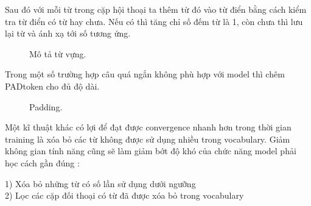 Sau đó với mỗi từ trong cặp hội thoại ta thêm từ đó vào từ điển bằng cách kiểm tra từ điển có từ hay chưa. Nếu có thì
tăng chỉ số đếm từ là 1, còn chưa thì lưu lại từ và ánh xạ tới số tương ứng. \\
\begin{figure}[!htb]
    \caption{\label{fig:no_padding} Mô tả từ vựng.}
\end{figure}
Trong một số trường hợp câu quá ngắn không phù hợp với model thì chêm PAD\detokenize{_}token cho đủ độ dài. \\
\begin{figure}[!htb]
    \caption{\label{fig:no_padding} Padding.}
\end{figure}
Một kĩ thuật khác có lợi để đạt được convergence nhanh hơn trong thời gian training là xóa bỏ các từ không được sử dụng nhiều trong vocabulary. Giảm không gian tính năng cũng sẽ làm giảm bớt độ khó của chức năng model phải học cách gần đúng :

1) Xóa bỏ những từ có số lần sử dụng dưới ngưỡng \\
2) Lọc các cặp đối thoại có từ đã được xóa bỏ trong vocabulary \\